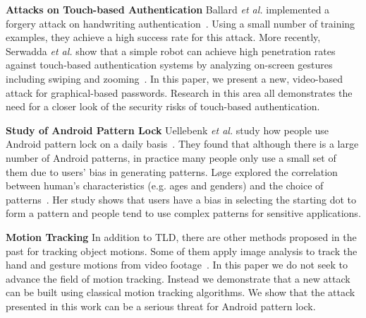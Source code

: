 \noindent \textbf{Attacks on Touch-based Authentication}
Ballard \emph{et al.} implemented a forgery attack on handwriting
authentication~\cite{ballard2007forgery}. Using a small number of training
examples, they achieve a high success rate for this attack. More recently,
Serwadda \emph{et al.} show that a simple robot can achieve high penetration
rates against touch-based authentication systems by analyzing on-screen gestures including
swiping and zooming~\cite{serwadda2013kids}.
In this paper, we present a new, video-based attack for graphical-based passwords.
Research in this area all demonstrates the need for a closer look of the security risks of touch-based authentication.



\noindent \textbf{Study of Android Pattern Lock}
Uellebenk \emph{et al.} study how people use Android pattern lock on
a daily basis~\cite{uellenbeck2013quantifying}.  They found that although there
is a large number of Android patterns, in
practice many people only use a small set of them due to users' bias in
generating patterns. L{\o}ge explored the correlation between
human's characteristics (e.g. ages and genders) and the choice of
patterns~\cite{alpnorway}. Her study shows that users have a bias in selecting the
starting dot to form a pattern and people tend to use complex patterns
for sensitive applications.

\noindent \textbf{Motion Tracking} In addition to TLD, there are other methods proposed in the past for tracking object
motions. Some of them apply image analysis to track the hand and gesture
motions from video
footage~\cite{Yang:2002:EMT:605089.605095,Stenger:2006:MHT:1159166.1159342,
citeulike:13091082}. In this paper we do not seek to advance the field of
motion tracking. Instead we demonstrate that a new attack can be built
using classical motion tracking algorithms. We show that the attack presented in
this work can be a serious threat for Android pattern lock. %

